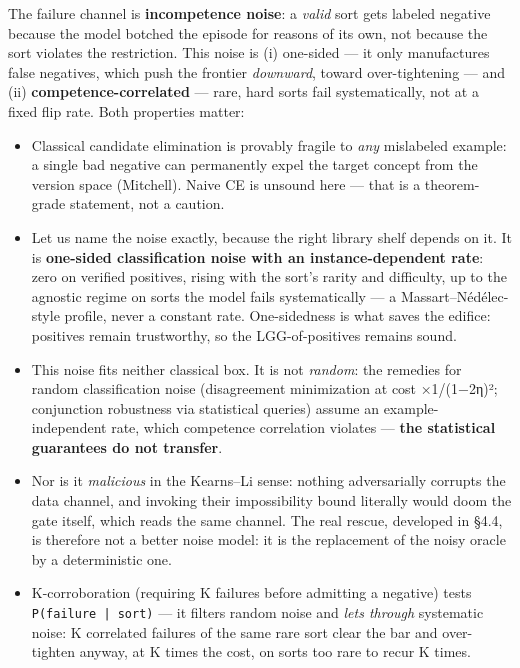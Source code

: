 \documentclass[11pt]{article}
\begin{document}
The failure channel is \textbf{incompetence noise}: a \emph{valid} sort gets labeled negative because the model botched the episode for reasons of its own, not because the sort violates the restriction. This noise is (i) one-sided — it only manufactures false negatives, which push the frontier \emph{downward}, toward over-tightening — and (ii) \textbf{competence-correlated} — rare, hard sorts fail systematically, not at a fixed flip rate. Both properties matter:

\begin{itemize}
\item Classical candidate elimination is provably fragile to \emph{any} mislabeled example: a single bad negative can permanently expel the target concept from the version space (Mitchell). Naive CE is unsound here — that is a theorem-grade statement, not a caution.
\item Let us name the noise exactly, because the right library shelf depends on it. It is \textbf{one-sided classification noise with an instance-dependent rate}: zero on verified positives, rising with the sort's rarity and difficulty, up to the agnostic regime on sorts the model fails systematically — a Massart–Nédélec-style profile, never a constant rate. One-sidedness is what saves the edifice: positives remain trustworthy, so the LGG-of-positives remains sound.
\item This noise fits neither classical box. It is not \emph{random}: the remedies for random classification noise (disagreement minimization at cost ×1/(1−2η)²; conjunction robustness via statistical queries) assume an example-independent rate, which competence correlation violates — \textbf{the statistical guarantees do not transfer}.
\item Nor is it \emph{malicious} in the Kearns–Li sense: nothing adversarially corrupts the data channel, and invoking their impossibility bound literally would doom the gate itself, which reads the same channel. The real rescue, developed in §4.4, is therefore not a better noise model: it is the replacement of the noisy oracle by a deterministic one.
\item K-corroboration (requiring K failures before admitting a negative) tests \texttt{P(failure | sort)} — it filters random noise and \emph{lets through} systematic noise: K correlated failures of the same rare sort clear the bar and over-tighten anyway, at K times the cost, on sorts too rare to recur K times.
\end{itemize}
\end{document}
